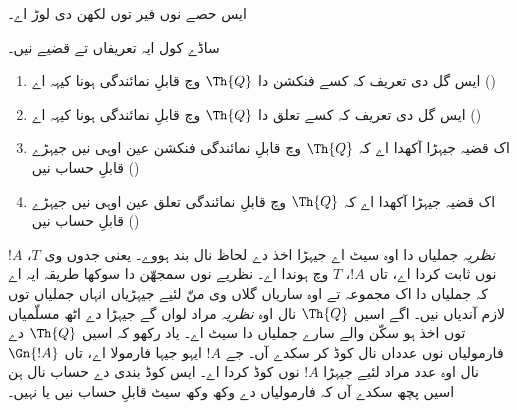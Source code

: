 \documentclass[../../../include/open-logic-section]{subfiles}
\begin{document}


\begin{editorial}
ایس حصے نوں فیر توں لکھن دی لوڑ اے۔
\end{editorial}

ساڈے کول ایہ تعریفاں تے قضیے نیں۔
\begin{enumerate}
\item ایس گل دی تعریف کہ کسے فنکشن دا $\Th{Q}$ وچ قابلِ نمائندگی
  ہونا کیہہ اے ()
\item ایس گل دی تعریف کہ کسے تعلق دا $\Th{Q}$ وچ قابلِ نمائندگی
  ہونا کیہہ اے ()
\item اک قضیہ جیہڑا آکھدا اے کہ $\Th{Q}$ وچ قابلِ نمائندگی فنکشن
  عین اوہی نیں جیہڑے قابلِ حساب نیں ()
\item اک قضیہ جیہڑا آکھدا اے کہ $\Th{Q}$ وچ قابلِ نمائندگی تعلق
  عین اوہی نیں جیہڑے قابلِ حساب نیں
  ()
\end{enumerate}

{\em نظریہ} جملیاں دا اوہ سیٹ اے جیہڑا اخذ دے لحاظ نال بند ہووے۔
یعنی جدوں وی $T$، $!A$ نوں ثابت کردا اے، تاں $!A$، $T$ وچ ہوندا اے۔
نظریے نوں سمجھّن دا سوکھا طریقہ ایہ اے کہ جملیاں دا اک مجموعہ
تے اوہ ساریاں گلاں وی منّ لئیے جیہڑیاں انہاں جملیاں توں لازم آندیاں نیں۔
اگے اسیں $\Th{Q}$ نال اوہ {\em نظریہ} مراد لواں گے جیہڑا
 دے اٹھ مسلّمیاں توں اخذ ہو سکّن والے سارے
جملیاں دا سیٹ اے۔ یاد رکھو کہ اسیں $\Th{Q}$ دے فارمولیاں نوں عدداں
نال کوڈ کر سکدے آں۔ جے $!A$ ایہو جیہا فارمولا اے، تاں $\Gn{!A}$
نال اوہ عدد مراد لئیے جیہڑا $!A$ نوں کوڈ کردا اے۔ ایس کوڈ بندی
دے حساب نال ہن اسیں پچھ سکدے آں کہ فارمولیاں دے وکھ وکھ سیٹ
قابلِ حساب نیں یا نہیں۔
\end{document}
